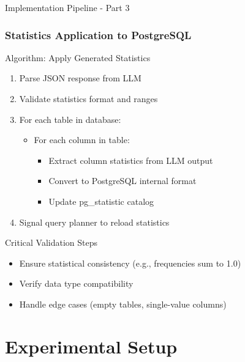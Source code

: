 \documentclass{beamer}
\begin{document}
\begin{frame}{Implementation Pipeline - Part 3}
\frametitle{Statistics Application to PostgreSQL}

\begin{block}{Algorithm: Apply Generated Statistics}
\begin{enumerate}
\item Parse JSON response from LLM
\item Validate statistics format and ranges
\item For each table in database:
    \begin{itemize}
    \item For each column in table:
        \begin{itemize}
        \item Extract column statistics from LLM output
        \item Convert to PostgreSQL internal format
        \item Update pg\_statistic catalog
        \end{itemize}
    \end{itemize}
\item Signal query planner to reload statistics
\end{enumerate}
\end{block}

\begin{alertblock}{Critical Validation Steps}
\begin{itemize}
    \item Ensure statistical consistency (e.g., frequencies sum to 1.0)
    \item Verify data type compatibility
    \item Handle edge cases (empty tables, single-value columns)
\end{itemize}
\end{alertblock}

\end{frame}

\section{Experimental Setup}
\end{document}
